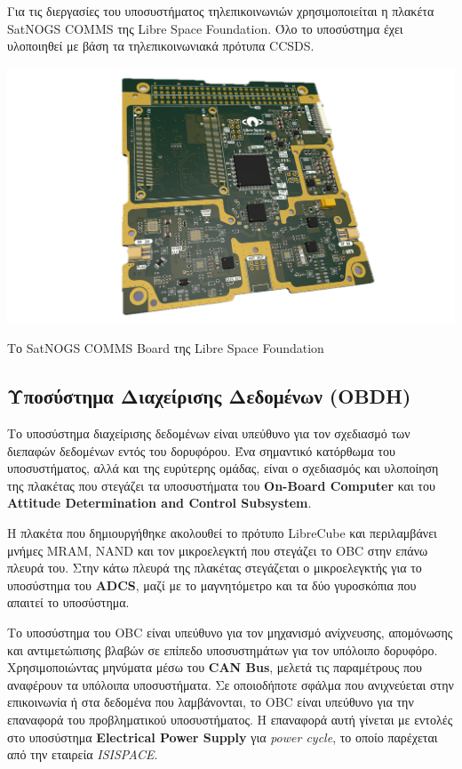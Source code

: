 \documentclass[a4paper,nobib,justified]{tufte-book}
\begin{document}
Για τις διεργασίες του υποσυστήματος τηλεπικοινωνιών χρησιμοποιείται η πλακέτα SatNOGS COMMS της Libre Space Foundation. Όλο το υποσύστημα έχει υλοποιηθεί με βάση τα τηλεπικοινωνιακά πρότυπα CCSDS.

\begin{marginfigure}
	\includegraphics{media/images/satnogs-comms.png}
	\caption{Το SatNOGS COMMS Board της Libre Space Foundation}
	\label{fig:satnogs-comms}
\end{marginfigure}

\subsection{Υποσύστημα Διαχείρισης Δεδομένων (\acs{OBDH})}
Το υποσύστημα διαχείρισης δεδομένων είναι υπεύθυνο για τον σχεδιασμό των διεπαφών δεδομένων εντός του δορυφόρου. Ένα σημαντικό κατόρθωμα του υποσυστήματος, αλλά και της ευρύτερης ομάδας, είναι ο σχεδιασμός και υλοποίηση της πλακέτας που στεγάζει τα υποσυστήματα του \textbf{On-Board Computer} και του \textbf{Attitude Determination and Control Subsystem}.

Η πλακέτα που δημιουργήθηκε ακολουθεί το πρότυπο LibreCube και περιλαμβάνει μνήμες MRAM, NAND και τον μικροελεγκτή που στεγάζει το OBC στην επάνω πλευρά του. Στην κάτω πλευρά της πλακέτας στεγάζεται ο μικροελεγκτής για το υποσύστημα του \textbf{ADCS}, μαζί με το μαγνητόμετρο και τα δύο γυροσκόπια που απαιτεί το υποσύστημα.

Το υποσύστημα του OBC είναι υπεύθυνο για τον μηχανισμό ανίχνευσης, απομόνωσης και αντιμετώπισης βλαβών σε επίπεδο υποσυστημάτων για τον υπόλοιπο δορυφόρο. Χρησιμοποιώντας μηνύματα μέσω του \textbf{CAN Bus}, μελετά τις παραμέτρους που αναφέρουν τα υπόλοιπα υποσυστήματα. Σε οποιοδήποτε σφάλμα που ανιχνεύεται στην επικοινωνία ή στα δεδομένα που λαμβάνονται, το OBC είναι υπεύθυνο για την επαναφορά του προβληματικού υποσυστήματος. Η επαναφορά αυτή γίνεται με εντολές στο υποσύστημα \textbf{Electrical Power Supply} για \emph{power cycle}, το οποίο παρέχεται από την εταιρεία \emph{ISISPACE}.
\end{document}
